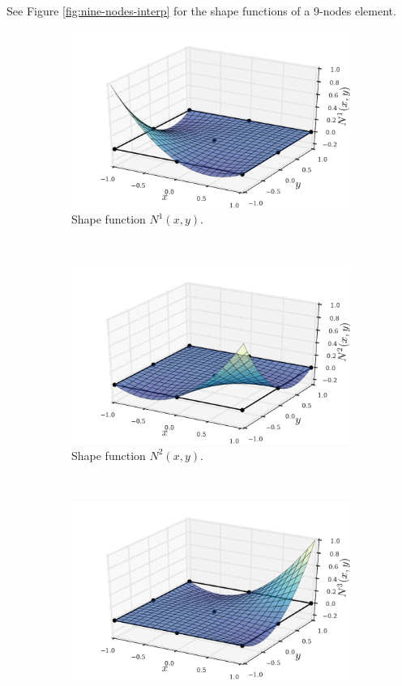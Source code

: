 See Figure \ref{fig:nine-nodes-interp} for the shape functions of a 9-nodes element.
\begin{figure}[H]
\centering
	\begin{subfigure}[b]{0.45\textwidth}\qquad
		\includegraphics[width=\textwidth]{shape_func-9-nodes-1.pdf}
		\caption{Shape function $N^1(x,y)$. }
	\end{subfigure}\,
%
	\begin{subfigure}[b]{0.45\textwidth}\qquad
		\includegraphics[width=\textwidth]{shape_func-9-nodes-2.pdf}
		\caption{Shape function $N^2(x,y)$.}
	\end{subfigure}\\
%
	\begin{subfigure}[b]{0.45\textwidth}\qquad
		\includegraphics[width=\textwidth]{shape_func-9-nodes-3.pdf}

\end{subfigure}
\end{figure}
